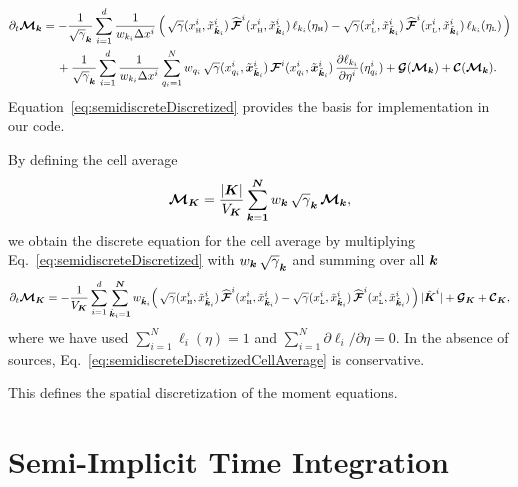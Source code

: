 \documentclass[10pt,preprint]{aastex}
\begin{document}
\begin{align}
  \partial_{t}{\boldsymbol{\mathcal{M}}_{\boldsymbol{k}}}
  &=
  -\frac{1}{\sqrt{\gamma}_{\boldsymbol{k}}}\sum_{i=1}^{d} 
  \frac{1}{w_{k_{i}}\Delta x^{i}}\,
  \Big(\,
    \sqrt{\gamma}(x_{\mbox{\tiny H}}^{i},\tilde{x}_{\tilde{\boldsymbol{k}}_{i}}^{i})\,\widehat{\boldsymbol{\mathcal{F}}}^{i}(x_{\mbox{\tiny H}}^{i},\tilde{x}_{\tilde{\boldsymbol{k}}_{i}}^{i})\,\ell_{k_{i}}(\eta_{\mbox{\tiny H}})
    -\sqrt{\gamma}(x_{\mbox{\tiny L}}^{i},\tilde{x}_{\tilde{\boldsymbol{k}}_{i}}^{i})\,\widehat{\boldsymbol{\mathcal{F}}}^{i}(x_{\mbox{\tiny L}}^{i},\tilde{x}_{\tilde{\boldsymbol{k}}_{i}}^{i})\,\ell_{k_{i}}(\eta_{\mbox{\tiny L}})
  \,\Big)
  \nonumber \\
  &\hspace{12pt}
  +\frac{1}{\sqrt{\gamma}_{\boldsymbol{k}}}\sum_{i=1}^{d}\frac{1}{w_{k_{i}}\Delta x^{i}}
  \sum_{q_{i}=1}^{N}w_{q_{i}}\,\sqrt{\gamma}(x_{q_{i}}^{i},\tilde{\boldsymbol{x}}_{\tilde{\boldsymbol{k}}_{i}}^{i})\,
  \boldsymbol{\mathcal{F}}^{i}(x_{q_{i}}^{i},\tilde{\boldsymbol{x}}_{\tilde{\boldsymbol{k}}_{i}}^{i})\,\frac{\partial \ell_{k_{i}}}{\partial \eta^{i}}(\eta_{q_{i}}^{i})
  +\boldsymbol{\mathcal{G}}(\boldsymbol{\mathcal{M}}_{\boldsymbol{k}})+\boldsymbol{\mathcal{C}}(\boldsymbol{\mathcal{M}}_{\boldsymbol{k}}).
  \label{eq:semidiscreteDiscretized}
\end{align}
Equation~\eqref{eq:semidiscreteDiscretized} provides the basis for implementation in our code.  

By defining the cell average
\begin{equation}
  \boldsymbol{\mathcal{M}}_{\boldsymbol{K}}=\frac{|\boldsymbol{K}|}{V_{\boldsymbol{K}}}\sum_{\boldsymbol{k}=\boldsymbol{1}}^{\boldsymbol{N}}w_{\boldsymbol{k}}\,\sqrt{\gamma}_{\boldsymbol{k}}\,\boldsymbol{\mathcal{M}}_{\boldsymbol{k}},
  \label{eq:conservedCellAverage}
\end{equation}
we obtain the discrete equation for the cell average by multiplying Eq.~\eqref{eq:semidiscreteDiscretized} with $w_{\boldsymbol{k}}\,\sqrt{\gamma}_{\boldsymbol{k}}$ and summing over all $\boldsymbol{k}$
\begin{equation}
  \partial_{t}{\boldsymbol{\mathcal{M}}_{\boldsymbol{K}}}
  =-\frac{1}{V_{\boldsymbol{K}}}\sum_{i=1}^{d}\sum_{\tilde{\boldsymbol{k}}_{i}=\boldsymbol{1}}^{\boldsymbol{N}}w_{\tilde{\boldsymbol{k}}_{i}}
  \Big(\,
    \sqrt{\gamma}(x_{\mbox{\tiny H}}^{i},\tilde{x}_{\tilde{\boldsymbol{k}}_{i}}^{i})\,\widehat{\boldsymbol{\mathcal{F}}}^{i}(x_{\mbox{\tiny H}}^{i},\tilde{x}_{\tilde{\boldsymbol{k}}_{i}}^{i})
    -\sqrt{\gamma}(x_{\mbox{\tiny L}}^{i},\tilde{x}_{\tilde{\boldsymbol{k}}_{i}}^{i})\,\widehat{\boldsymbol{\mathcal{F}}}^{i}(x_{\mbox{\tiny L}}^{i},\tilde{x}_{\tilde{\boldsymbol{k}}_{i}}^{i})
  \,\Big)\,|\tilde{\boldsymbol{K}}^{i}|
  +\boldsymbol{\mathcal{G}}_{\boldsymbol{K}}+\boldsymbol{\mathcal{C}}_{\boldsymbol{K}},
  \label{eq:semidiscreteDiscretizedCellAverage}
\end{equation}
where we have used $\sum_{i=1}^{N}\ell_{i}(\eta)=1$ and $\sum_{i=1}^{N}\partial\ell_{i}/\partial\eta=0$.  
In the absence of sources, Eq.~\eqref{eq:semidiscreteDiscretizedCellAverage} is conservative.  

This defines the spatial discretization of the moment equations.  

\clearpage

\section{Semi-Implicit Time Integration}
\end{document}
